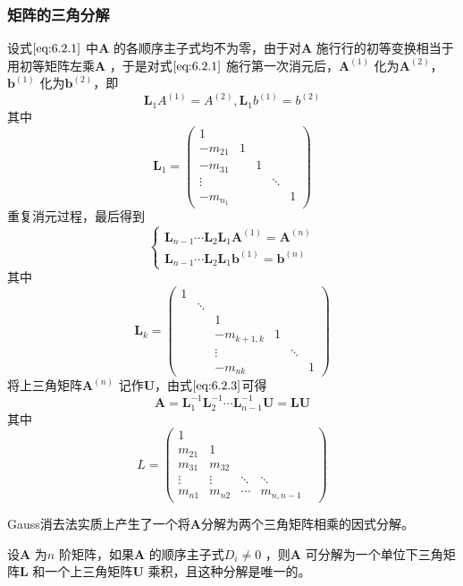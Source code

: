 \documentclass[a4paper]{article}
\begin{document}
\subsubsection{矩阵的三角分解}
设式$\ref{eq:6.2.1}$ 中$\mathbf{A}$ 的各顺序主子式均不为零，由于对$\mathbf{A}$ 施行行的初等变换相当于用初等矩阵左乘$\mathbf{A}$ ，于是对式$\ref{eq:6.2.1}$ 施行第一次消元后，$\mathbf{A}^{(1)}$ 化为$\mathbf{A}^{(2)}$，$\mathbf{b}^{(1)}$ 化为$\mathbf{b}^{(2)}$，即
\[
	\mathbf{L}_1 A^{(1)} = A^{(2)}, \mathbf{L}_1 b^{(1)} = b^{(2)}
\] 
其中
\[
	\mathbf{L}_1 = \begin{pmatrix}
		1 & & & & \\
		-m_{21} & 1 & & & \\
		-m_{31} & & 1 & & \\
		\vdots & & & \ddots & \\
		-m_{n_1} & & & & 1
	\end{pmatrix} 
\] 
重复消元过程，最后得到
\[
\tag{6.2.3} \label{eq:6.2.3} 
\begin{cases}
	\mathbf{L}_{n-1} \cdots \mathbf{L}_2 \mathbf{L}_1 \mathbf{A}^{(1)} = \mathbf{A}^{(n)} \\
	\mathbf{L}_{n-1} \cdots \mathbf{L}_2 \mathbf{L}_1 \mathbf{b}^{(1)} = \mathbf{b}^{(n)}
\end{cases} 
\] 
其中
\[
	\mathbf{L}_k = \begin{pmatrix} 
	1 & & & & & \\
	  & \ddots & & & & \\
	  & & 1 & & & \\
	  & & -m_{k+1, k} & 1 & & \\
	  & & \vdots & & \ddots & \\
	  & & -m_{nk} & & & 1
\end{pmatrix} 
\] 
将上三角矩阵$\mathbf{A}^{(n)}$ 记作$\mathbf{U}$，由式$\ref{eq:6.2.3}$可得
 \[
	 \mathbf{A} = \mathbf{L}_1^{-1} \mathbf{L}_2^{-1} \cdots \mathbf{L}_{n-1}^{-1} \mathbf{U} = \mathbf{L} \mathbf{U}
\] 
其中
\[
L = \begin{pmatrix} 
	1 & & & & \\
	m_{21} & 1 & & & \\
	m_{31} & m_{32} & & & \\
	\vdots & \vdots & \ddots & \ddots & \\
	m_{n1} & m_{n2} & \cdots & m_{n,n-1} & 
\end{pmatrix} 
\] 

Gauss消去法实质上产生了一个将$\mathbf{A}$分解为两个三角矩阵相乘的因式分解。

\begin{theorem}
	设$\mathbf{A}$ 为$n$ 阶矩阵，如果$\mathbf{A}$ 的顺序主子式$D_i \neq 0$ ，则$\mathbf{A}$ 可分解为一个单位下三角矩阵$\mathbf{L}$ 和一个上三角矩阵$\mathbf{U}$ 乘积，且这种分解是唯一的。
\end{theorem}
\end{document}
